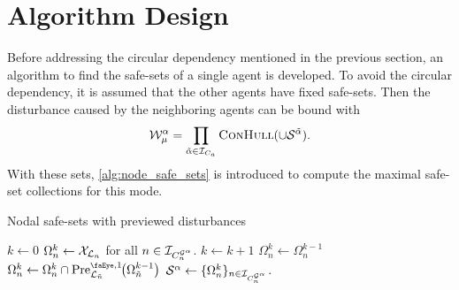 \section{Algorithm Design}
Before addressing the circular dependency mentioned in the previous section, an algorithm to find the safe-sets of a single agent is developed. To avoid the circular dependency, it is assumed that the other agents have fixed safe-sets. Then the disturbance caused by the neighboring agents can be bound with
\begin{equation}
\wcon[\agentidx][\modeidx]=\prod_{\tilde{\agentidx}\in\idxset{\numagents}}\Call{ConHull}{\cup\mathcal{S}^{\tilde{\agentidx}}}.
\end{equation}
With these sets, \autoref{alg:node_safe_sets} is introduced to compute the maximal safe-set collections for this mode. 
\begin{algorithm}[t]
\caption{Nodal safe-sets with previewed disturbances}\label{alg:node_safe_sets}
\begin{algorithmic}[1]
\State $k\gets0$
\State $\Omega_{n}^k\gets\xcon[\gnodelabel{n}]$ for all $n\in\idxset{\gnumnodes[\agentidx]}$.
\Repeat 
	\State $k\gets k+1$
		\State $\Omega_{n}^k\gets\Omega_{n}^{k-1}$
				\State $\Omega_{n}^k\gets\Omega_{n}^k\cap\PreviewedPre[\gnodelabel{\tilde{n}}][1]{\Omega_{\tilde{n}}^{k-1}}$
			\EndFor
	\EndFor
{}
\State $\safeset{}^\agentidx\gets\{\Omega_{n}^k\}_{n\in\idxset{\gnumnodes[\agentidx]}}$.\;
\EndProcedure
\end{algorithmic}
\end{algorithm}

